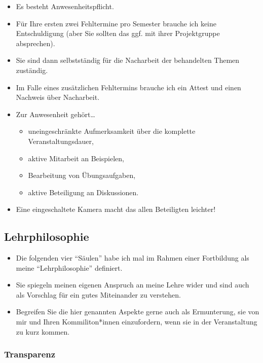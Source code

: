 \documentclass[
  ngerman,
]{article}
\providecommand{\tightlist}{%
  \setlength{\itemsep}{0pt}\setlength{\parskip}{0pt}}
\begin{document}
\begin{itemize}
\tightlist
\item
  Es besteht Anwesenheitspflicht.
\item
  Für Ihre ersten zwei Fehltermine pro Semester brauche ich keine Entschuldigung (aber Sie sollten das ggf. mit ihrer Projektgruppe absprechen).
\item
  Sie sind dann selbstständig für die Nacharbeit der behandelten Themen zuständig.
\item
  Im Falle eines zusätzlichen Fehltermins brauche ich ein Attest und einen Nachweis über Nacharbeit.
\item
  Zur Anwesenheit gehört\ldots{}

  \begin{itemize}
  \tightlist
  \item
    uneingeschränkte Aufmerksamkeit über die komplette Veranstaltungsdauer,
  \item
    aktive Mitarbeit an Beispielen,
  \item
    Bearbeitung von Übungsaufgaben,
  \item
    aktive Beteiligung an Diskussionen.
  \end{itemize}
\item
  Eine eingeschaltete Kamera macht das allen Beteiligten leichter!
\end{itemize}

\hypertarget{lehrphilosophie}{%
\subsection{Lehrphilosophie}\label{lehrphilosophie}}

\begin{itemize}
\tightlist
\item
  Die folgenden vier ``Säulen'' habe ich mal im Rahmen einer Fortbildung als meine ``Lehrphilosophie'' definiert.
\item
  Sie spiegeln meinen eigenen Anspruch an meine Lehre wider und sind auch als Vorschlag für ein gutes Miteinander zu verstehen.
\item
  Begreifen Sie die hier genannten Aspekte gerne auch als Ermunterung, sie von mir und Ihren Kommiliton*innen einzufordern, wenn sie in der Veranstaltung zu kurz kommen.
\end{itemize}

\hypertarget{transparenz}{%
\subsubsection{Transparenz}\label{transparenz}}
\end{document}
